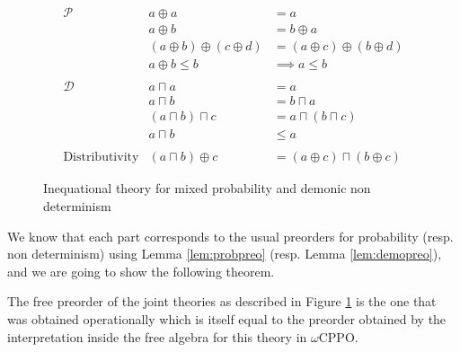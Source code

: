 \begin{figure}[h]
    \begin{equation*}
        \begin{array}{lrl}
            \mathcal{P} & a \oplus a &= a \\
                        & a \oplus b &= b \oplus a \\
                        & (a \oplus b) \oplus (c \oplus d) &= (a \oplus c) \oplus (b \oplus d) \\
                        & a \oplus b \leq b &\implies a \leq b  \\
            \\
            \mathcal{D} & a \sqcap a &= a \\
                        & a \sqcap b &= b \sqcap a \\
                        & (a \sqcap b) \sqcap c &= a \sqcap (b \sqcap c) \\
                        & a \sqcap b &\leq a \\ 
            \\
            \text{Distributivity}
            & (a \sqcap b) \oplus c &= (a \oplus c) \sqcap (b \oplus c)
        \end{array}
    \end{equation*}
    \caption{Inequational theory for mixed probability and demonic non
    determinism}
    \label{fig:mixtheory}
\end{figure}

We know that each part corresponds to the usual 
preorders for probability (resp. non determinism) using 
Lemma \ref{lem:probpreo} (resp. Lemma \ref{lem:demopreo}), 
and we are going to show the following theorem.

\begin{atheorem}
The 
free preorder of the joint theories as described in Figure \ref{fig:mixtheory}
is the one that was obtained 
operationally which is itself equal to the preorder 
obtained by the interpretation inside the free 
algebra for this theory in $\omega$CPPO.
\end{atheorem}

